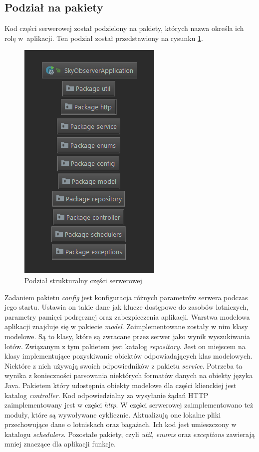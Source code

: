 \documentclass[12pt, twoside]{report}
\begin{document}
\subsection{Podział na pakiety}
Kod części serwerowej został podzielony na pakiety, których nazwa określa ich rolę w~aplikacji. Ten podział został przedstawiony na rysunku \ref{fig:server_structure}.
\begin{figure}[!ht]
\centering
\includegraphics[scale=0.90, keepaspectratio]{server_structure.png}
\caption{Podział strukturalny części serwerowej}
\label{fig:server_structure}
\end{figure}
Zadaniem pakietu \emph{config} jest konfiguracja różnych parametrów serwera podczas jego startu. Ustawia on takie dane jak klucze dostępowe do zasobów lotniczych, parametry pamięci podręcznej oraz zabezpieczenia aplikacji. Warstwa modelowa aplikacji znajduje się w pakiecie \textit{model}. Zaimplementowane zostały w nim klasy modelowe. Są to klasy, które są zwracane przez serwer jako wynik wyszukiwania lotów. Związanym z tym pakietem jest katalog \textit{repository}. Jest on miejscem na klasy implementujące pozyskiwanie obiektów odpowiadających klas modelowych. Niektóre z nich używają swoich odpowiedników z pakietu \textit{service}. Potrzeba ta wynika z konieczności parsowania niektórych formatów danych na obiekty języka Java. Pakietem który udostępnia obiekty modelowe dla części klienckiej jest katalog \textit{controller}. Kod odpowiedzialny za wysyłanie żądań HTTP zaimplementowany jest w części \textit{http}. W części serwerowej zaimplementowano też moduły, które są wywoływane cyklicznie. Aktualizują one lokalne pliki przechowujące dane o lotniskach oraz bagażach. Ich kod jest umieszczony w katalogu \textit{schedulers}. Pozostałe pakiety, czyli \textit{util, enums} oraz \textit{exceptions} zawierają mniej znaczące dla aplikacji funkcje.  
\end{document}
